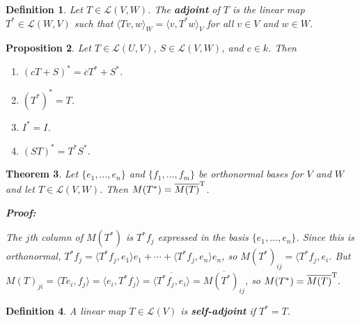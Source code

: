 \documentclass{article}
\theoremstyle{colontheorem}
\newtheorem{theorem}{Theorem}[section]
\newtheorem{proposition}[theorem]{Proposition}
\newtheorem{definition}[theorem]{Definition}
\newenvironment{Theorem}
{
	\begin{mdframed}[backgroundcolor=TheoremOrange!10]
	\begin{theorem}
}
{
	\end{theorem}
	\end{mdframed}
	
	\vspace{.15in}
}
\newenvironment{Proposition}
{
	\begin{mdframed}[backgroundcolor=TheoremOrange!10]
	\begin{proposition}
}
{
	\end{proposition}
	\end{mdframed}
	
	\vspace{.15in}
}
\newenvironment{Def}
{
	\begin{mdframed}[backgroundcolor=DefGreen!10]
	\begin{definition}
}
{
	\end{definition}
	\end{mdframed}
	
	\vspace{.15in}
}
\newenvironment{Proof}
{
	\begin{mdframed}[backgroundcolor=ProofPurple!10]
	\textbf{Proof:}%
}
{
	\end{mdframed}
	
	\vspace{.085in}
}
\begin{document}
\begin{Def}
	
	Let $T \in \mathcal{L}(V, W)$. The \textbf{adjoint} of $T$ is the linear map $T^* \in \mathcal{L}(W, V)$ such that $\langle Tv, w \rangle_W = \langle v, T^*w \rangle_V$ for all $v \in V$ and $w \in W$.
	
\end{Def}



\begin{Proposition}
	
	Let $T \in \mathcal{L}(U, V)$, $S \in \mathcal{L}(V, W)$, and $c \in k$. Then
	
	\begin{enumerate}
		
		\item $(cT + S)^* = \overline{c} T^* + S^*$.
		\item $(T^*)^* = T$.
		\item $I^* = I$.
		\item $(ST)^* = T^* S^*$.
		
	\end{enumerate}
	
\end{Proposition}



\begin{Theorem}
	
	Let $\{e_1, ..., e_n\}$ and $\{f_1, ..., f_m\}$ be orthonormal bases for $V$ and $W$ and let $T \in \mathcal{L}(V, W)$. Then $M(T^*) = \overline{M(T)}^\textnormal{T}$.
	
	\begin{Proof}
		The $j$th column of $M(T^*)$ is $T^* f_j$ expressed in the basis $\{e_1, ..., e_n\}$. Since this is orthonormal, $T^* f_j = \langle T^* f_j, e_1 \rangle e_1 + \cdots + \langle T^* f_j, e_n \rangle e_n$, so $M(T^*)_{ij} = \langle T^* f_j, e_i$. But $M(T)_{ji} = \langle Te_i, f_j \rangle = \langle e_i, T^* f_j \rangle = \overline{\langle T^* f_j, e_i \rangle} = \overline{M(T^*)_{ij}}$, so $M(T^*) = \overline{M(T)}^\textnormal{T}.$
		
	\end{Proof}
	
\end{Theorem}



\begin{Def}
	
	A linear map $T \in \mathcal{L}(V)$ is \textbf{self-adjoint} if $T^* = T$.
	
\end{Def}
\end{document}
